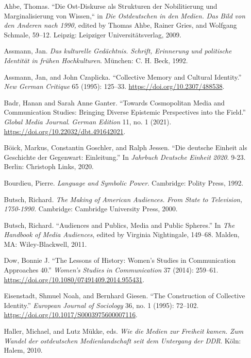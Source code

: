 \documentclass{tufte-handout}
\begin{document}
\begin{hangparas}{.25in}{1} 



Ahbe, Thomas. ``Die Ost-Diskurse als Strukturen der Nobilitierung und
Marginalisierung von Wissen,`` in \emph{Die Ostdeutschen in den Medien.
Das Bild von den Anderen nach 1990,} edited by Thomas Ahbe, Rainer
Gries, and Wolfgang Schmale, 59--12. Leipzig: Leipziger
Universitätsverlag, 2009.

Assmann, Jan. \emph{Das kulturelle Gedächtnis. Schrift, Erinnerung und
politische Identität in frühen Hochkulturen}. München: C. H. Beck, 1992.

Assmann, Jan, and John Czaplicka. ``Collective Memory and Cultural
Identity.'' \emph{New German Critique} 65 (1995): 125--33.
\url{https://doi.org/10.2307/488538}.

Badr, Hanan and Sarah Anne Ganter. ``Towards Cosmopolitan Media and
Communication Studies: Bringing Diverse Epistemic Perspectives into the
Field.'' \emph{Global Media Journal}. \emph{German Edition} 11, no. 1
(2021). \url{https://doi.org/10.22032/dbt.491642021}.

Böick, Markus, Constantin Goschler, and Ralph Jessen. ``Die deutsche
Einheit als Geschichte der Gegenwart: Einleitung.'' In \emph{Jahrbuch
Deutsche Einheit} \emph{2020}. 9-23. Berlin: Christoph Links, 2020.

Bourdieu, Pierre. \emph{Language and Symbolic Power}. Cambridge: Polity
Press, 1992.

Butsch, Richard. \emph{The Making of American Audiences. From State to
Television, 1750-1990.} Cambridge: Cambridge University Press, 2000.

Butsch, Richard. ``Audiences and Publics, Media and Public Spheres.'' In
\emph{The Handbook of Media Audiences}, edited by Virginia Nightingale,
149--68. Malden, MA: Wiley-Blackwell, 2011.

Dow, Bonnie J. ``The Lessons of History: Women's Studies in
Communication Approaches 40.'' \emph{Women's Studies in Communication}
37 (2014): 259--61. \url{https://doi.org/10.1080/07491409.2014.955431}.

Eisenstadt, Shmuel Noah, and Bernhard Giesen. ``The Construction of
Collective Identity.'' \emph{European Journal of Sociology} 36, no. 1
(1995): 72--102. \url{https://doi.org/10.1017/S0003975600007116}.

Haller, Michael, and Lutz Mükke, eds. \emph{Wie die Medien zur Freiheit
kamen. Zum Wandel der ostdeutschen Medienlandschaft seit dem Untergang
der DDR}. Köln: Halem, 2010.


\end{hangparas}
\end{document}
